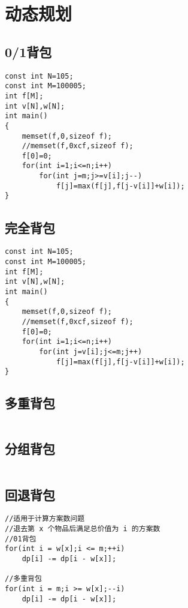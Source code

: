 \documentclass[twocolumn,a4]{article}
\begin{document}
\section{动态规划}
\subsection{0/1背包}
\begin{lstlisting}
const int N=105;
const int M=100005;
int f[M];
int v[N],w[N];
int main()
{
    memset(f,0,sizeof f);
    //memset(f,0xcf,sizeof f);
    f[0]=0;
    for(int i=1;i<=n;i++)
        for(int j=m;j>=v[i];j--)
            f[j]=max(f[j],f[j-v[i]]+w[i]);
}
\end{lstlisting}

\subsection{完全背包}
\begin{lstlisting}
const int N=105;
const int M=100005;
int f[M];
int v[N],w[N];
int main()
{
    memset(f,0,sizeof f);
    //memset(f,0xcf,sizeof f);
    f[0]=0;
    for(int i=1;i<=n;i++)
        for(int j=v[i];j<=m;j++)
            f[j]=max(f[j],f[j-v[i]]+w[i]);
}
\end{lstlisting}

\subsection{多重背包}
\begin{lstlisting}

\end{lstlisting}

\subsection{分组背包}
\begin{lstlisting}

\end{lstlisting}

\subsection{回退背包}
\begin{lstlisting}
//适用于计算方案数问题
//退去第 x 个物品后满足总价值为 i 的方案数
//01背包
for(int i = w[x];i <= m;++i)
    dp[i] -= dp[i - w[x]];

//多重背包
for(int i = m;i >= w[x];--i)
    dp[i] -= dp[i - w[x]];
\end{lstlisting}
\end{document}
